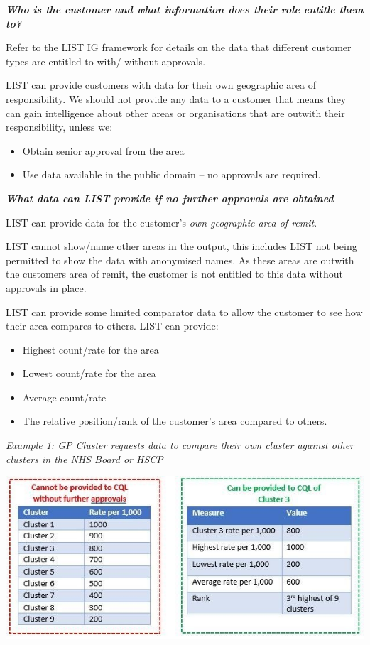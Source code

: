 \documentclass[
]{book}
\begin{document}
\emph{\textbf{Who is the customer and what information does their role entitle them to?}}

Refer to the LIST IG framework for details on the data that different customer types are entitled to with/ without approvals.

LIST can provide customers with data for their own geographic area of responsibility. We should not provide any data to a customer that means they can gain intelligence about other areas or organisations that are outwith their responsibility, unless we:

\begin{itemize}
\item
  Obtain senior approval from the area
\item
  Use data available in the public domain -- no approvals are required.
\end{itemize}

\emph{\textbf{What data can LIST provide if no further approvals are obtained}}

LIST can provide data for the customer's \emph{own geographic area of remit}.

LIST cannot show/name other areas in the output, this includes LIST not being permitted to show the data with anonymised names. As these areas are outwith the customers area of remit, the customer is not entitled to this data without approvals in place.

LIST can provide some limited comparator data to allow the customer to see how their area compares to others. LIST can provide:

\begin{itemize}
\item
  Highest count/rate for the area
\item
  Lowest count/rate for the area
\item
  Average count/rate
\item
  The relative position/rank of the customer's area compared to others.
\end{itemize}

\emph{Example 1: GP Cluster requests data to compare their own cluster against other clusters in the NHS Board or HSCP}

\includegraphics[width=1\linewidth]{imgs/comparator-ex1}
\end{document}
